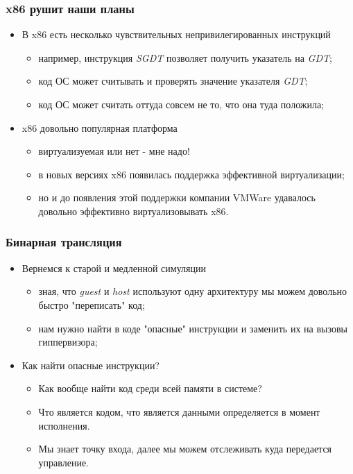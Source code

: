 \begin{frame}
\frametitle{x86 рушит наши планы}
\begin{itemize}
  \item<1-> В x86 есть несколько чувствительных непривилегированных инструкций
    \begin{itemize}
      \item например, инструкция \emph{SGDT} позволяет получить указатель на
            \emph{GDT};
      \item код ОС может считывать и проверять значение указателя \emph{GDT};
      \item код ОС может считать оттуда совсем не то, что она туда положила;
    \end{itemize}
  \item<2-> x86 довольно популярная платформа
    \begin{itemize}
      \item виртуализуемая или нет - мне надо!
      \item в новых версиях x86 появилась поддержка эффективной виртуализации;
      \item но и до появления этой поддержки компании VMWare удавалось довольно
            эффективно виртуализовывать x86.
    \end{itemize}
\end{itemize}
\end{frame}

\begin{frame}
\frametitle{Бинарная трансляция}
\begin{itemize}
  \item<1-> Вернемся к старой и медленной симуляции
    \begin{itemize}
      \item зная, что \emph{guest} и \emph{host} используют одну архитектуру
            мы можем довольно быстро "переписать" код;
      \item нам нужно найти в коде "опасные" инструкции и заменить их на вызовы
            гиппервизора;
    \end{itemize}
  \item<2-> Как найти опасные инструкции?
    \begin{itemize}
      \item Как вообще найти код среди всей памяти в системе?
      \item Что является кодом, что является данными определяется в момент
            исполнения.
      \item Мы знает точку входа, далее мы можем отслеживать куда передается
            управление.
    \end{itemize}
\end{itemize}
\end{frame}

